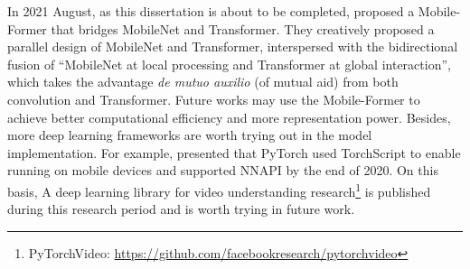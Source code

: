 In 2021 August, as this dissertation is about to be completed, \citet{chen2021mobileformer} proposed a Mobile-Former that bridges MobileNet and Transformer.
They creatively proposed a parallel design of MobileNet and Transformer, interspersed with the bidirectional fusion of ``MobileNet at local processing and Transformer at global interaction'', which takes the advantage \textit{de mutuo auxilio} (of mutual aid) from both convolution and Transformer.
Future works may use the Mobile-Former to achieve better computational efficiency and more representation power.
Besides, more deep learning frameworks are worth trying out in the model implementation.
For example, \citet{reiss2020pytorch} presented that PyTorch used TorchScript to enable running on mobile devices and supported NNAPI by the end of 2020.
On this basis, A deep learning library for video understanding research\footnote{PyTorchVideo: \url{https://github.com/facebookresearch/pytorchvideo}} is published during this research period and is worth trying in future work.
